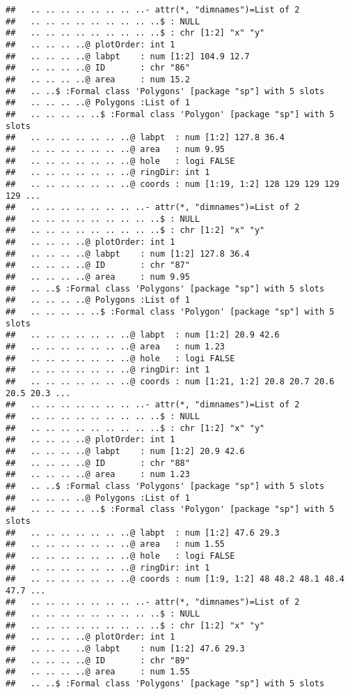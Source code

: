 \documentclass[]{article}
\begin{document}
\begin{verbatim}
##   .. .. .. .. .. .. .. ..- attr(*, "dimnames")=List of 2
##   .. .. .. .. .. .. .. .. ..$ : NULL
##   .. .. .. .. .. .. .. .. ..$ : chr [1:2] "x" "y"
##   .. .. .. ..@ plotOrder: int 1
##   .. .. .. ..@ labpt    : num [1:2] 104.9 12.7
##   .. .. .. ..@ ID       : chr "86"
##   .. .. .. ..@ area     : num 15.2
##   .. ..$ :Formal class 'Polygons' [package "sp"] with 5 slots
##   .. .. .. ..@ Polygons :List of 1
##   .. .. .. .. ..$ :Formal class 'Polygon' [package "sp"] with 5 slots
##   .. .. .. .. .. .. ..@ labpt  : num [1:2] 127.8 36.4
##   .. .. .. .. .. .. ..@ area   : num 9.95
##   .. .. .. .. .. .. ..@ hole   : logi FALSE
##   .. .. .. .. .. .. ..@ ringDir: int 1
##   .. .. .. .. .. .. ..@ coords : num [1:19, 1:2] 128 129 129 129 129 ...
##   .. .. .. .. .. .. .. ..- attr(*, "dimnames")=List of 2
##   .. .. .. .. .. .. .. .. ..$ : NULL
##   .. .. .. .. .. .. .. .. ..$ : chr [1:2] "x" "y"
##   .. .. .. ..@ plotOrder: int 1
##   .. .. .. ..@ labpt    : num [1:2] 127.8 36.4
##   .. .. .. ..@ ID       : chr "87"
##   .. .. .. ..@ area     : num 9.95
##   .. ..$ :Formal class 'Polygons' [package "sp"] with 5 slots
##   .. .. .. ..@ Polygons :List of 1
##   .. .. .. .. ..$ :Formal class 'Polygon' [package "sp"] with 5 slots
##   .. .. .. .. .. .. ..@ labpt  : num [1:2] 20.9 42.6
##   .. .. .. .. .. .. ..@ area   : num 1.23
##   .. .. .. .. .. .. ..@ hole   : logi FALSE
##   .. .. .. .. .. .. ..@ ringDir: int 1
##   .. .. .. .. .. .. ..@ coords : num [1:21, 1:2] 20.8 20.7 20.6 20.5 20.3 ...
##   .. .. .. .. .. .. .. ..- attr(*, "dimnames")=List of 2
##   .. .. .. .. .. .. .. .. ..$ : NULL
##   .. .. .. .. .. .. .. .. ..$ : chr [1:2] "x" "y"
##   .. .. .. ..@ plotOrder: int 1
##   .. .. .. ..@ labpt    : num [1:2] 20.9 42.6
##   .. .. .. ..@ ID       : chr "88"
##   .. .. .. ..@ area     : num 1.23
##   .. ..$ :Formal class 'Polygons' [package "sp"] with 5 slots
##   .. .. .. ..@ Polygons :List of 1
##   .. .. .. .. ..$ :Formal class 'Polygon' [package "sp"] with 5 slots
##   .. .. .. .. .. .. ..@ labpt  : num [1:2] 47.6 29.3
##   .. .. .. .. .. .. ..@ area   : num 1.55
##   .. .. .. .. .. .. ..@ hole   : logi FALSE
##   .. .. .. .. .. .. ..@ ringDir: int 1
##   .. .. .. .. .. .. ..@ coords : num [1:9, 1:2] 48 48.2 48.1 48.4 47.7 ...
##   .. .. .. .. .. .. .. ..- attr(*, "dimnames")=List of 2
##   .. .. .. .. .. .. .. .. ..$ : NULL
##   .. .. .. .. .. .. .. .. ..$ : chr [1:2] "x" "y"
##   .. .. .. ..@ plotOrder: int 1
##   .. .. .. ..@ labpt    : num [1:2] 47.6 29.3
##   .. .. .. ..@ ID       : chr "89"
##   .. .. .. ..@ area     : num 1.55
##   .. ..$ :Formal class 'Polygons' [package "sp"] with 5 slots

\end{verbatim}
\end{document}
